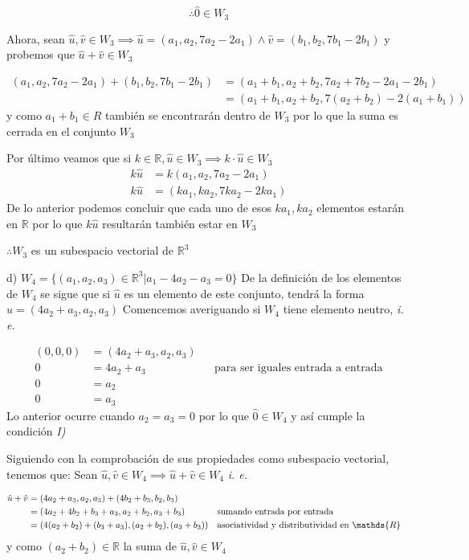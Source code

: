 \documentclass[letterpaper]{article}
\newcommand{\R}{\mathds{R}}
\renewcommand{\*}{\cdot}
\theoremstyle{definition}
\begin{document}
 $$ \therefore \hat{0} \in W_3 $$
 
 Ahora, sean $ \hat{u}, \hat{v} \in W_3 \implies \hat{u} = (a_1, a_2, 7a_2 - 2a_1) \land \hat{v} = (b_1, b_2, 7b_1 - 2 b_1) $ y probemos que $ \hat{u} + \hat{v} \in W_3 $
 
 \begin{align*}
 	(a_1, a_2, 7a_2 - 2a_1) + (b_1, b_2, 7b_1 - 2 b_1) &= (a_1 + b_1, a_2 + b _2, 7a_2 + 7b_2 -2a_1 - 2b_1)\\
 	&= (a_1 + b_1, a_2 + b _2, 7(a_2 + b_2) -2(a_1 +b_1))
 \end{align*}
 y como $ a_1 + b_1 \in R $ también se encontrarán dentro de $ W_3 $ por lo que la suma es cerrada en el conjunto $ W_3 $
 
 Por último veamos que si $ k \in \R, \hat{u} \in W_3 \implies k\* \hat{u} \in W_3 $
	\begin{align*}
		k\hat{u} &= k(a_1, a_2, 7a_2 - 2a_1)\\
		k\hat{u} &= (ka_1, ka_2, 7ka_2 - 2ka_1)
	\end{align*}
	De lo anterior podemos concluir que cada uno de esos $ ka_1, ka_2 $  elementos estarán en $ \R  $ por lo que $ k\hat{u} $ resultarán también estar en $ W_3 $
	\begin{center}
	$ \therefore W_3$ es un subespacio vectorial de $ \R^3 $
	\end{center}

d) $W_{4} = \lbrace (a_{1},a_{2},a_{3}) \in \mathbb{R}^{3} \big\vert  a_{1} - 4a_{2} - a_{3} = 0 \rbrace$
De la definición de los elementos de $ W_4 $ se sigue que si $ \hat{u} $ es un elemento de este conjunto, tendrá la forma $ \hat{u}= (4a_2 + a_3, a_2, a_3) $
Comencemos averiguando si $ W_4 $ tiene elemento neutro, \textit{i. e.}

\begin{align*}
	(0,0,0) &= (4a_2 + a_3, a_2, a_3) \\
	0 &= 4a_2 + a_3 && \text{para ser iguales entrada a entrada}\\
	0 &= a_2 && \\
	0 &= a_3 && 
\end{align*}
Lo anterior ocurre cuando $ a_2 = a_3 = 0 $ por lo que $ \hat{0} \in W_4 $ y así cumple la condición \textit{I)}

Siguiendo con la comprobación de sus propiedades como subespacio vectorial, tenemos que: Sean $ \hat{u}, \hat{v} \in W_4 \implies \hat{u} + \hat{v} \in W_4 $ \textit{i. e.}

\begin{align*}
		\hat{u} + \hat{v} &= (4a_2 + a_3, a_2, a_3) + (4b_2 + b_3, b_2, b_3)\\
		&= (4a_2 + 4b_2 + b_3 + a_3, a_2 + b_2, a_3 + b_3) && \text{sumando entrada por entrada}\\
		&= (4(a_2 + b_2) + (b_3 + a_3), (a_2 + b_2), (a_3 + b_3)) && \text{asociatividad y distributividad en $ \R $}\\
\end{align*}
y como $ (a_2 + b_2) \in \R $ la suma de $ \hat{u}, \hat{v} \in W_4 $
\end{document}
